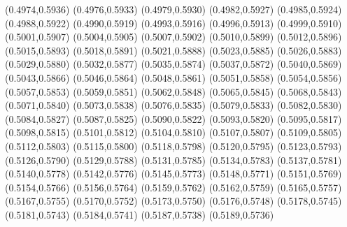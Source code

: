 \PST@Filltriangle(0.4974,0.5936)
\PST@Filltriangle(0.4976,0.5933)
\PST@Filltriangle(0.4979,0.5930)
\PST@Filltriangle(0.4982,0.5927)
\PST@Filltriangle(0.4985,0.5924)
\PST@Filltriangle(0.4988,0.5922)
\PST@Filltriangle(0.4990,0.5919)
\PST@Filltriangle(0.4993,0.5916)
\PST@Filltriangle(0.4996,0.5913)
\PST@Filltriangle(0.4999,0.5910)
\PST@Filltriangle(0.5001,0.5907)
\PST@Filltriangle(0.5004,0.5905)
\PST@Filltriangle(0.5007,0.5902)
\PST@Filltriangle(0.5010,0.5899)
\PST@Filltriangle(0.5012,0.5896)
\PST@Filltriangle(0.5015,0.5893)
\PST@Filltriangle(0.5018,0.5891)
\PST@Filltriangle(0.5021,0.5888)
\PST@Filltriangle(0.5023,0.5885)
\PST@Filltriangle(0.5026,0.5883)
\PST@Filltriangle(0.5029,0.5880)
\PST@Filltriangle(0.5032,0.5877)
\PST@Filltriangle(0.5035,0.5874)
\PST@Filltriangle(0.5037,0.5872)
\PST@Filltriangle(0.5040,0.5869)
\PST@Filltriangle(0.5043,0.5866)
\PST@Filltriangle(0.5046,0.5864)
\PST@Filltriangle(0.5048,0.5861)
\PST@Filltriangle(0.5051,0.5858)
\PST@Filltriangle(0.5054,0.5856)
\PST@Filltriangle(0.5057,0.5853)
\PST@Filltriangle(0.5059,0.5851)
\PST@Filltriangle(0.5062,0.5848)
\PST@Filltriangle(0.5065,0.5845)
\PST@Filltriangle(0.5068,0.5843)
\PST@Filltriangle(0.5071,0.5840)
\PST@Filltriangle(0.5073,0.5838)
\PST@Filltriangle(0.5076,0.5835)
\PST@Filltriangle(0.5079,0.5833)
\PST@Filltriangle(0.5082,0.5830)
\PST@Filltriangle(0.5084,0.5827)
\PST@Filltriangle(0.5087,0.5825)
\PST@Filltriangle(0.5090,0.5822)
\PST@Filltriangle(0.5093,0.5820)
\PST@Filltriangle(0.5095,0.5817)
\PST@Filltriangle(0.5098,0.5815)
\PST@Filltriangle(0.5101,0.5812)
\PST@Filltriangle(0.5104,0.5810)
\PST@Filltriangle(0.5107,0.5807)
\PST@Filltriangle(0.5109,0.5805)
\PST@Filltriangle(0.5112,0.5803)
\PST@Filltriangle(0.5115,0.5800)
\PST@Filltriangle(0.5118,0.5798)
\PST@Filltriangle(0.5120,0.5795)
\PST@Filltriangle(0.5123,0.5793)
\PST@Filltriangle(0.5126,0.5790)
\PST@Filltriangle(0.5129,0.5788)
\PST@Filltriangle(0.5131,0.5785)
\PST@Filltriangle(0.5134,0.5783)
\PST@Filltriangle(0.5137,0.5781)
\PST@Filltriangle(0.5140,0.5778)
\PST@Filltriangle(0.5142,0.5776)
\PST@Filltriangle(0.5145,0.5773)
\PST@Filltriangle(0.5148,0.5771)
\PST@Filltriangle(0.5151,0.5769)
\PST@Filltriangle(0.5154,0.5766)
\PST@Filltriangle(0.5156,0.5764)
\PST@Filltriangle(0.5159,0.5762)
\PST@Filltriangle(0.5162,0.5759)
\PST@Filltriangle(0.5165,0.5757)
\PST@Filltriangle(0.5167,0.5755)
\PST@Filltriangle(0.5170,0.5752)
\PST@Filltriangle(0.5173,0.5750)
\PST@Filltriangle(0.5176,0.5748)
\PST@Filltriangle(0.5178,0.5745)
\PST@Filltriangle(0.5181,0.5743)
\PST@Filltriangle(0.5184,0.5741)
\PST@Filltriangle(0.5187,0.5738)
\PST@Filltriangle(0.5189,0.5736)
